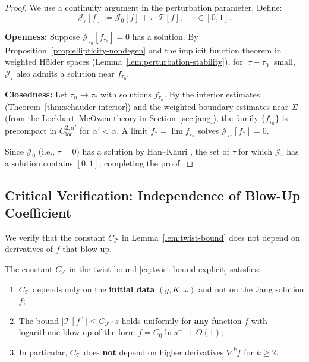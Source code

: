 \begin{proof}
We use a continuity argument in the perturbation parameter. Define:
\[
\mathcal{J}_\tau[f] := \mathcal{J}_0[f] + \tau \cdot \mathcal{T}[f], \quad \tau \in [0, 1].
\]

\textbf{Openness:} Suppose $\mathcal{J}_{\tau_0}[f_{\tau_0}] = 0$ has a solution. By Proposition~\ref{prop:ellipticity-nondegen} and the implicit function theorem in weighted H\"older spaces (Lemma~\ref{lem:perturbation-stability}), for $|\tau - \tau_0|$ small, $\mathcal{J}_\tau$ also admits a solution near $f_{\tau_0}$.

\textbf{Closedness:} Let $\tau_n \to \tau_*$ with solutions $f_{\tau_n}$. By the interior estimates (Theorem~\ref{thm:schauder-interior}) and the weighted boundary estimates near $\Sigma$ (from the Lockhart--McOwen theory in Section~\ref{sec:jang}), the family $\{f_{\tau_n}\}$ is precompact in $C^{2,\alpha'}_{\mathrm{loc}}$ for $\alpha' < \alpha$. A limit $f_* = \lim f_{\tau_n}$ solves $\mathcal{J}_{\tau_*}[f_*] = 0$.

Since $\mathcal{J}_0$ (i.e., $\tau = 0$) has a solution by Han--Khuri \cite{hankhuri2013}, the set of $\tau$ for which $\mathcal{J}_\tau$ has a solution contains $[0, 1]$, completing the proof.
\end{proof}

\subsection{Critical Verification: Independence of Blow-Up Coefficient}

We verify that the constant $C_\mathcal{T}$ in Lemma~\ref{lem:twist-bound} does not depend on derivatives of $f$ that blow up.

\begin{lemma}\label{lem:twist-constant-independence}
The constant $C_\mathcal{T}$ in the twist bound \eqref{eq:twist-bound-explicit} satisfies:
\begin{enumerate}[label=\textup{(\roman*)}]
    \item $C_\mathcal{T}$ depends only on the \textbf{initial data} $(g, K, \omega)$ and not on the Jang solution $f$;
    \item The bound $|\mathcal{T}[f]| \leq C_\mathcal{T} \cdot s$ holds uniformly for \textbf{any} function $f$ with logarithmic blow-up of the form $f = C_0 \ln s^{-1} + O(1)$;
    \item In particular, $C_\mathcal{T}$ does \textbf{not} depend on higher derivatives $\nabla^k f$ for $k \geq 2$.
\end{enumerate}
\end{lemma}


